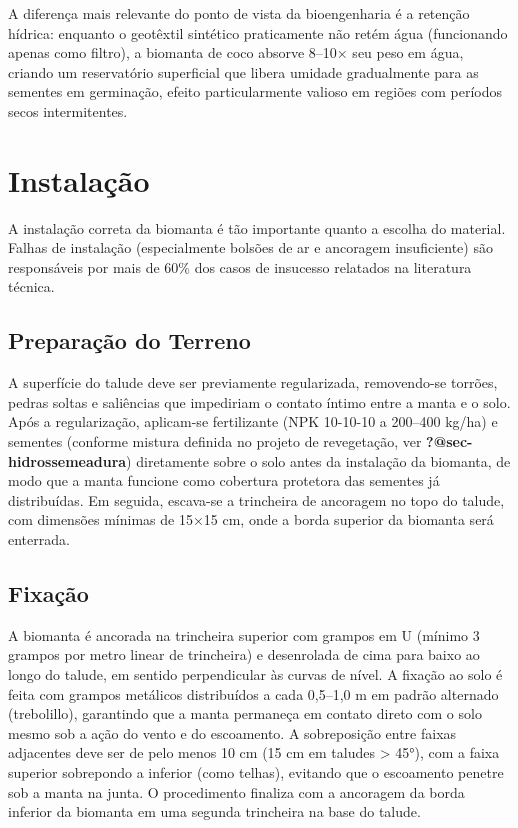 \documentclass[
  portuguese,
  11pt,
  a4paper,
  open=any]{scrbook}
\begin{document}
A diferença mais relevante do ponto de vista da bioengenharia é a
retenção hídrica: enquanto o geotêxtil sintético praticamente não retém
água (funcionando apenas como filtro), a biomanta de coco absorve 8--10×
seu peso em água, criando um reservatório superficial que libera umidade
gradualmente para as sementes em germinação, efeito particularmente
valioso em regiões com períodos secos intermitentes.

\section{Instalação}\label{instalauxe7uxe3o-1}

A instalação correta da biomanta é tão importante quanto a escolha do
material. Falhas de instalação (especialmente bolsões de ar e ancoragem
insuficiente) são responsáveis por mais de 60\% dos casos de insucesso
relatados na literatura técnica.

\subsection{Preparação do Terreno}\label{preparauxe7uxe3o-do-terreno}

A superfície do talude deve ser previamente regularizada, removendo-se
torrões, pedras soltas e saliências que impediriam o contato íntimo
entre a manta e o solo. Após a regularização, aplicam-se fertilizante
(NPK 10-10-10 a 200--400 kg/ha) e sementes (conforme mistura definida no
projeto de revegetação, ver \textbf{?@sec-hidrossemeadura}) diretamente
sobre o solo antes da instalação da biomanta, de modo que a manta
funcione como cobertura protetora das sementes já distribuídas. Em
seguida, escava-se a trincheira de ancoragem no topo do talude, com
dimensões mínimas de 15×15 cm, onde a borda superior da biomanta será
enterrada.

\subsection{Fixação}\label{fixauxe7uxe3o}

A biomanta é ancorada na trincheira superior com grampos em U (mínimo 3
grampos por metro linear de trincheira) e desenrolada de cima para baixo
ao longo do talude, em sentido perpendicular às curvas de nível. A
fixação ao solo é feita com grampos metálicos distribuídos a cada
0,5--1,0 m em padrão alternado (trebolillo), garantindo que a manta
permaneça em contato direto com o solo mesmo sob a ação do vento e do
escoamento. A sobreposição entre faixas adjacentes deve ser de pelo
menos 10 cm (15 cm em taludes \textgreater{} 45°), com a faixa superior
sobrepondo a inferior (como telhas), evitando que o escoamento penetre
sob a manta na junta. O procedimento finaliza com a ancoragem da borda
inferior da biomanta em uma segunda trincheira na base do talude.
\end{document}
